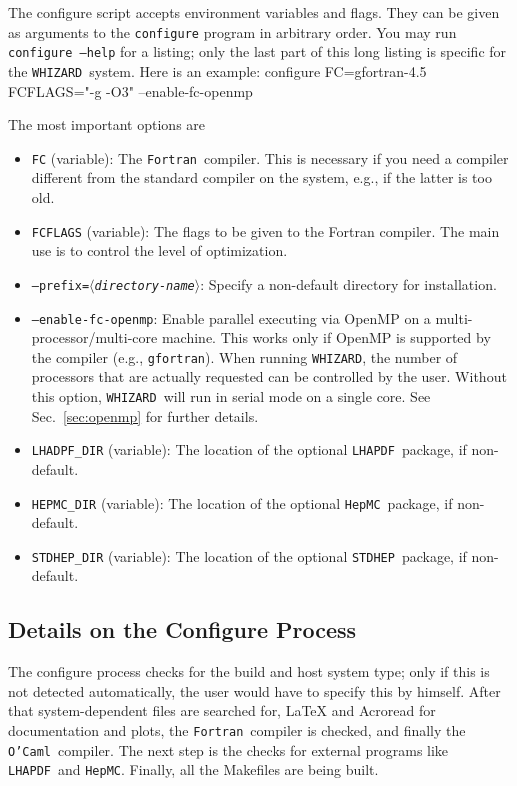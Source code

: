 \documentclass[12pt]{book}
\newenvironment{interaction}%
  {\begingroup\small
   \verbatim}%
  {\endverbatim
   \endgroup\noindent}
\newcommand{\var}[1]{$\langle$\textit{#1}$\rangle$}
\newcommand{\ttt}[1]{\texttt{#1}}
\newcommand{\whizard}{\texttt{WHIZARD}}
\newcommand{\stdhep}{\texttt{STDHEP}}
\newcommand{\lhapdf}{\texttt{LHAPDF}}
\newcommand{\hepmc}{\texttt{HepMC}}
\newcommand{\fortran}{\texttt{Fortran}}
\newcommand{\ocaml}{\texttt{O'Caml}}
\begin{document}
The configure script accepts environment variables and flags.  They
can be given as arguments to the \ttt{configure} program in arbitrary
order.  You may run \ttt{configure --help} for a listing; only the
last part of this long listing is specific for the \whizard\ system.
Here is an example:
\begin{interaction}
  configure  FC=gfortran-4.5  FCFLAGS="-g -O3"  --enable-fc-openmp
\end{interaction}

The most important options are
\begin{itemize}
\item
  \ttt{FC} (variable): The \fortran\ compiler.  This is necessary if
  you need a compiler different from the standard compiler on the
  system, e.g., if the latter is too old.
\item
  \ttt{FCFLAGS} (variable): The flags to be given to the Fortran
  compiler.  The main use is to control the level of optimization.
\item
  \ttt{--prefix=\var{directory-name}}: Specify a non-default directory
  for installation.
\item
  \ttt{--enable-fc-openmp}: Enable parallel executing via OpenMP on a
  multi-processor/multi-core machine.  This works only if OpenMP is
  supported by the compiler (e.g., \ttt{gfortran}).  When running
  \whizard, the number of processors that are actually requested can
  be controlled by the user.  Without this option, \whizard\ will run
  in serial mode on a single core.  See Sec.~\ref{sec:openmp} for
  further details.
\item
  \ttt{LHADPF\_DIR} (variable): The location of the optional \lhapdf\
  package, if non-default.
\item
  \ttt{HEPMC\_DIR} (variable): The location of the optional \hepmc\ package, if
  non-default.
\item
  \ttt{STDHEP\_DIR} (variable): The location of the optional \stdhep\
  package, if non-default.
\end{itemize}


\subsection{Details on the Configure Process}

The configure process checks for the build and host system type; only
if this is not detected automatically, the user would have to specify
this by himself. After that system-dependent files are searched for,
LaTeX and Acroread for documentation and plots, the \fortran\ compiler 
is checked, and finally the \ocaml\ compiler. The next step is the
checks for external programs like \lhapdf\ and \texttt{HepMC}.
Finally, all the Makefiles are being built. 
\end{document}
